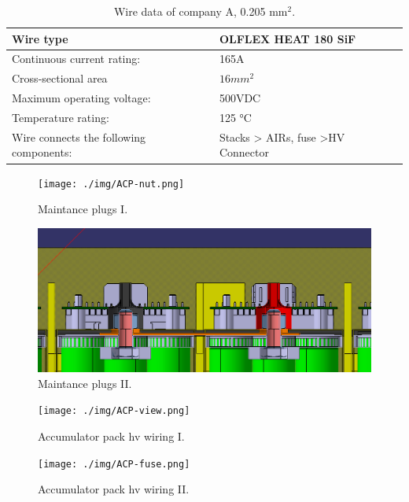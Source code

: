 \begin{table}[htbp]
	\centering
	\caption{Wire data of company A, 0.205 mm$^2$.}
	\begin{tabularx}{\textwidth}{|X|X|}\hline
		Wire type & OLFLEX HEAT 180 SiF \\[\TableSize]\hline
		Continuous current rating: & 165A \\[\TableSize]\hline
		Cross-sectional area & $16mm^2$ \\[\TableSize]\hline
		Maximum operating voltage: &  500VDC\\[\TableSize]\hline
		Temperature rating: &  125 °C\\[\TableSize]\hline
		Wire connects the following components: & Stacks > AIRs, fuse >HV Connector \\[\TableSize]\hline
	\end{tabularx}%
	\label{tab:acc-wire}%
\end{table}%

\begin{figure}[H]
	\centering
	\texttt{[image: ./img/ACP-nut.png]}
	\caption{Maintance plugs I.}
	\label{fig:acp-maintance-plug}
\end{figure}

\begin{figure}[H]
	\centering
	\includegraphics[width=\textwidth]{./img/ACP-nut2.png}
	\caption{Maintance plugs II.}
	\label{fig:acp-maintance-plug2}
\end{figure}

\begin{figure}[H]
	\centering
	\texttt{[image: ./img/ACP-view.png]}
	\caption{Accumulator pack \gls{hv} wiring I.}
	\label{fig:acp-hv-wiring}
\end{figure}

\begin{figure}[H]
	\centering
	\texttt{[image: ./img/ACP-fuse.png]}
	\caption{Accumulator pack \gls{hv} wiring II.}
	\label{fig:acp-hv-wiring2}
\end{figure}

